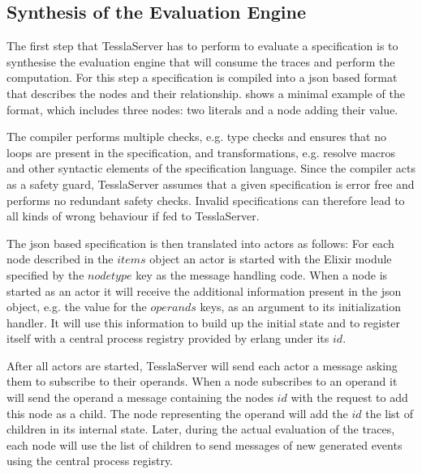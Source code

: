\subsection{Synthesis of the Evaluation Engine}

The first step that TesslaServer has to perform to evaluate a specification is to synthesise the evaluation engine that will consume the traces and perform the computation.
For this step a specification is compiled into a \gls{json} based format that describes the nodes and their relationship.
 shows a minimal example of the format, which includes three nodes: two literals and a node adding their value.



The compiler performs multiple checks, e.g. type checks and ensures that no loops are present in the specification, and transformations, e.g. resolve macros and other syntactic elements of the specification language.
Since the compiler acts as a safety guard, TesslaServer assumes that a given specification is error free and performs no redundant safety checks.
Invalid specifications can therefore lead to all kinds of wrong behaviour if fed to TesslaServer.

The \gls{json} based specification is then translated into actors as follows: For each node described in the \(\mathit{items}\) object an actor is started with the Elixir module specified by the \(\mathit{nodetype}\) key as the message handling code.
When a node is started as an actor it will receive the additional information present in the \gls{json} object, e.g. the value for the \(\mathit{operands}\) keys, as an argument to its initialization handler.
It will use this information to build up the initial state and to register itself with a central process registry provided by erlang under its \(\mathit{id}\).

After all actors are started, TesslaServer will send each actor a message asking them to subscribe to their operands.
When a node subscribes to an operand it will send the operand a message containing the nodes \(\mathit{id}\) with the request to add this node as a child.
The node representing the operand will add the \(\mathit{id}\) the list of children in its internal state.
Later, during the actual evaluation of the traces, each node will use the list of children to send messages of new generated events using the central process registry.

